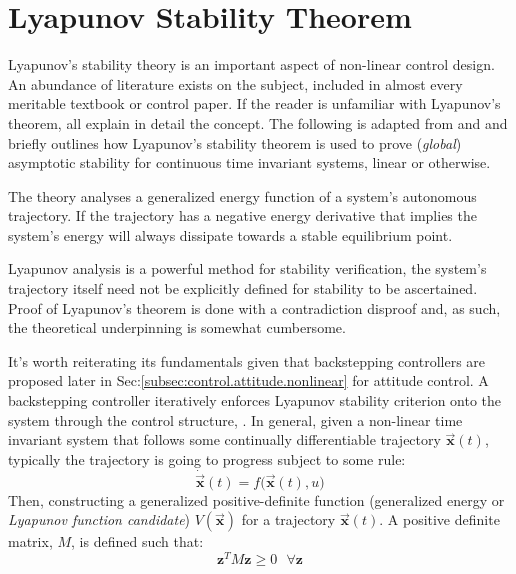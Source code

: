 \section{Lyapunov Stability Theorem}
\label{sec:control.lyapunov}
Lyapunov's stability theory is an important aspect of non-linear control design. An abundance of literature exists on the subject, included in almost every meritable textbook or control paper. If the reader is unfamiliar with Lyapunov's theorem,  \cite{noteonlyapunov,nonlinearsystems,bojelayupanov} all explain in detail the concept. The following is adapted from \cite{bojelayupanov} and \cite{lyapunovstabilitytheorem} and briefly outlines how Lyapunov's stability theorem is used to prove (\emph{global}) asymptotic stability for continuous time invariant systems, linear or otherwise.
\par
The theory analyses a generalized energy function of a system's autonomous trajectory. If the trajectory has a negative energy derivative that implies the system's energy will always dissipate towards a stable equilibrium point. 
\par
Lyapunov analysis is a powerful method for stability verification, the system's trajectory itself need not be explicitly defined for stability to be ascertained. Proof of Lyapunov's theorem is done with a contradiction disproof and, as such, the theoretical underpinning is somewhat cumbersome.
\par
It's worth reiterating its fundamentals given that backstepping controllers are proposed later in Sec:\ref{subsec:control.attitude.nonlinear} for attitude control. A backstepping controller iteratively enforces Lyapunov stability criterion onto the system through the control structure, \cite{backstepping,adaptivebackstep,intelligentbackstep}. In general, given a non-linear time invariant system that follows some continually differentiable trajectory $\vec{\mathbf{x}}(t)$, typically the trajectory is going to progress subject to some rule:
\begin{equation}
\dot{\vec{\mathbf{x}}}(t)=f\big(\vec{\mathbf{x}}(t),u\big)
\end{equation}
Then, constructing a generalized positive-definite function (generalized energy or \emph{Lyapunov function candidate}) $V(\vec{\mathbf{x}})$ for a trajectory $\vec{\mathbf{x}}(t)$. A positive definite matrix, $M$, is defined such that:
\begin{equation}
\mathbf{z}^TM\mathbf{z}\geq 0~~~\forall \mathbf{z}
\end{equation}
